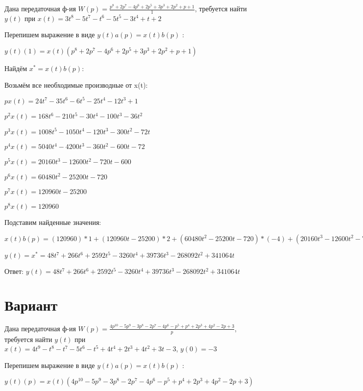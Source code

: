 \documentclass{article}
\begin{document}
{{{{{{Дана передаточная ф-ия $W(p)=\frac{p^{8}+2p^{7}-4p^{6}+2p^{5}+3p^{3}+2p^{2}+p+1}{1}$, требуется найти $y(t)$ при $x(t)=3t^{8}-5t^{7}-t^{6}-5t^{5}-3t^{4}+t+2$

Перепишем выражение в виде $y(t)a(p)=x(t)b(p)$ :

$y(t)(1)=x(t)(p^{8}+2p^{7}-4p^{6}+2p^{5}+3p^{3}+2p^{2}+p+1)$

Найдём $x^*=x(t)b(p)$:

Возьмём все необходимые производные от x(t):

$px(t)=24t^{7}-35t^{6}-6t^{5}-25t^{4}-12t^{3}+1$

$p^2x(t)=168t^{6}-210t^{5}-30t^{4}-100t^{3}-36t^{2}$

$p^3x(t)=1008t^{5}-1050t^{4}-120t^{3}-300t^{2}-72t$

$p^4x(t)=5040t^{4}-4200t^{3}-360t^{2}-600t-72$

$p^5x(t)=20160t^{3}-12600t^{2}-720t-600$

$p^6x(t)=60480t^{2}-25200t-720$

$p^7x(t)=120960t-25200$

$p^8x(t)=120960$

Подставим найденные значения:

$x(t)b(p) = (120960)*1+(120960t-25200)*2+(60480t^{2}-25200t-720)*(-4)+(20160t^{3}-12600t^{2}-720t-600)*2+(1008t^{5}-1050t^{4}-120t^{3}-300t^{2}-72t)*3+(168t^{6}-210t^{5}-30t^{4}-100t^{3}-36t^{2})*2+(24t^{7}-35t^{6}-6t^{5}-25t^{4}-12t^{3}+1)*1+(24t^{7}-35t^{6}-6t^{5}-25t^{4}-12t^{3}+1)*1=48t^{7}+266t^{6}+2592t^{5}-3260t^{4}+39736t^{3}-268092t^{2}+341064t$





$y(t)=x^*=48t^{7}+266t^{6}+2592t^{5}-3260t^{4}+39736t^{3}-268092t^{2}+341064t$

Ответ: $y(t) = 48t^{7}+266t^{6}+2592t^{5}-3260t^{4}+39736t^{3}-268092t^{2}+341064t$

\section{Вариант}

Дана передаточная ф-ия $W(p)=\frac{4p^{10}-5p^{9}-3p^{8}-2p^{7}-4p^{6}-p^{5}+p^{4}+2p^{3}+4p^{2}-2p+3}{p}$, требуется найти $y(t)$ при $x(t)=4t^{9}-t^{8}-t^{7}-5t^{6}-t^{5}+4t^{4}+2t^{3}+4t^{2}+3t-3$, $y(0)=-3$

Перепишем выражение в виде $y(t)a(p)=x(t)b(p)$ :

$y(t)(p)=x(t)(4p^{10}-5p^{9}-3p^{8}-2p^{7}-4p^{6}-p^{5}+p^{4}+2p^{3}+4p^{2}-2p+3)$

}}}}}}
\end{document}
